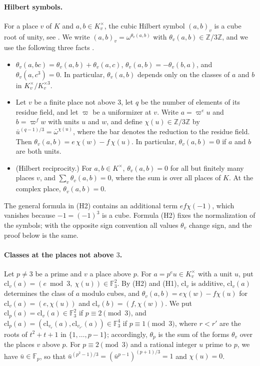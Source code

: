 \documentclass[11pt]{article}
\newcommand{\Z}{\mathbb{Z}}
\newcommand{\F}{\mathbb{F}}
\begin{document}
\paragraph{Hilbert symbols.} For a place $v$ of $K$ and $a,b\in K_v^\times$, the cubic Hilbert symbol $(a,b)_v$ is a cube root of unity, see \cite[Chapter~V, \S3]{N}. We write $(a,b)_v=\omega^{\theta_v(a,b)}$ with $\theta_v(a,b)\in\Z/3\Z$, and we use the following three facts \cite[Chapter~V, \S3 and Chapter~VI, \S8]{N}.
\begin{itemize}
\item[(H1)] $\theta_v(a,bc)=\theta_v(a,b)+\theta_v(a,c)$, $\theta_v(a,b)=-\theta_v(b,a)$, and $\theta_v(a,c^3)=0$. In particular, $\theta_v(a,b)$ depends only on the classes of $a$ and $b$ in $K_v^\times/K_v^{\times3}$.
\item[(H2)] Let $v$ be a finite place not above $3$, let $q$ be the number of elements of its residue field, and let $\varpi$ be a uniformizer at $v$. Write $a=\varpi^eu$ and $b=\varpi^fw$ with units $u$ and $w$, and define $\chi(u)\in\Z/3\Z$ by $\bar u^{(q-1)/3}=\bar\omega^{\chi(u)}$, where the bar denotes the reduction to the residue field. Then $\theta_v(a,b)=e\,\chi(w)-f\,\chi(u)$. In particular, $\theta_v(a,b)=0$ if $a$ and $b$ are both units.
\item[(H3)] (Hilbert reciprocity.) For $a,b\in K^\times$, $\theta_v(a,b)=0$ for all but finitely many places $v$, and $\sum_v\theta_v(a,b)=0$, where the sum is over all places of $K$. At the complex place, $\theta_v(a,b)=0$.
\end{itemize}
The general formula in (H2) contains an additional term $ef\chi(-1)$, which vanishes because $-1=(-1)^3$ is a cube. Formula (H2) fixes the normalization of the symbols; with the opposite sign convention all values $\theta_v$ change sign, and the proof below is the same.

\paragraph{Classes at the places not above $3$.} Let $p\neq3$ be a prime and $v$ a place above $p$. For $a=p^eu\in K_v^\times$ with a unit $u$, put $\mathrm{cl}_v(a)=(e\bmod3,\ \chi(u))\in\F_3^2$. By (H2) and (H1), $\mathrm{cl}_v$ is additive, $\mathrm{cl}_v(a)$ determines the class of $a$ modulo cubes, and $\theta_v(a,b)=e\chi(w)-f\chi(u)$ for $\mathrm{cl}_v(a)=(e,\chi(u))$ and $\mathrm{cl}_v(b)=(f,\chi(w))$. We put $\mathrm{cl}_p(a)=\mathrm{cl}_v(a)\in\F_3^2$ if $p\equiv2\pmod3$, and $\mathrm{cl}_p(a)=(\mathrm{cl}_{v_r}(a),\mathrm{cl}_{v_{r'}}(a))\in\F_3^4$ if $p\equiv1\pmod3$, where $r<r'$ are the roots of $t^2+t+1$ in $\{1,\dots,p-1\}$; accordingly, $\theta_p$ is the sum of the forms $\theta_v$ over the places $v$ above $p$. For $p\equiv2\pmod3$ and a rational integer $u$ prime to $p$, we have $\bar u\in\F_p$, so that $\bar u^{(p^2-1)/3}=(\bar u^{p-1})^{(p+1)/3}=1$ and $\chi(u)=0$.
\end{document}
